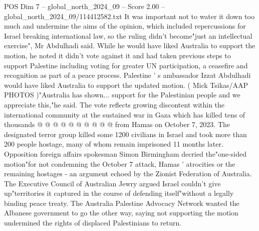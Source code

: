\begin{textsample}{POS Dim 7 – global\_north\_2024\_09 – Score 2.00 – global\_north\_2024\_09/114412582.txt}
It was important not to water it down too much and undermine the aims of the opinion, which included repercussions for Israel breaking international law, so the ruling didn't become"just an intellectual exercise", Mr Abdulhadi said.
While he would have liked Australia to support the motion, he noted it didn't vote against it and had taken previous steps to support Palestine including voting for greater UN participation, a ceasefire and recognition as part of a peace process.
Palestine ' s ambassador Izzat Abdulhadi would have liked Australia to support the updated motion. ( Mick Tsikas/AAP PHOTOS )"Australia has shown... support for the Palestinian people and we appreciate this,"he said.
The vote reflects growing discontent within the international community at the sustained war in Gaza which has killed tens of thousands @ @ @ @ @ @ @ @ @ @ from Hamas on October 7, 2023.
The designated terror group killed some 1200 civilians in Israel and took more than 200 people hostage, many of whom remain imprisoned 11 months later.
Opposition foreign affairs spokesman Simon Birmingham decried the"one-sided motion"for not condemning the October 7 attack, Hamas ' atrocities or the remaining hostages - an argument echoed by the Zionist Federation of Australia.
The Executive Council of Australian Jewry argued Israel couldn't give up"territories it captured in the course of defending itself"without a legally binding peace treaty.
The Australia Palestine Advocacy Network wanted the Albanese government to go the other way, saying not supporting the motion undermined the rights of displaced Palestinians to return.

\end{textsample}
